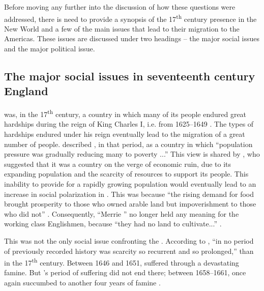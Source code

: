 Before moving any further into the discussion of how these questions were addressed, there is need to provide a synopsis of the 17\textsuperscript{th} century  presence in the New World and a few of the main issues that lead to their migration to the Americas. These issues are discussed under two headings -- the major social issues and the major political issue.

\subsection{The major social issues in seventeenth century England}\label{6.1.1}
 was, in the 17\textsuperscript{th} century, a country in which many of its people endured great hardships during the reign of King Charles I, i.e. from 1625--1649 \citep[25]{Parker11}. The types of hardships endured under his reign eventually lead to the migration of a great number of people. \citet[145]{Fisher90} described , in that period, as a country in which ``population pressure was gradually reducing many to poverty ...'' This view is shared by \citet[37]{Beckles89}, who suggested that it was a country on the verge of economic ruin, due to its expanding population and the scarcity of resources to support its people. This inability to provide for a rapidly growing population would eventually lead to an increase in social polarization in . This was because ``the rising demand for food brought prosperity to those who owned arable land but impoverishment to those who did not'' \citep[3]{Amussen09}. Consequently, ``Merrie '' no longer held any meaning for the working class Englishmen, because ``they had no land to cultivate...'' \citep[394]{Bridenbaugh68}.

This was not the only social issue confronting the . According to \citet[57]{Rogers89}, ``in no period of previously recorded history was scarcity so recurrent and so prolonged,'' than in the 17\textsuperscript{th} century. Between 1646 and 1651,  suffered through a devastating famine. But 's period of suffering did not end there; between 1658--1661,  once again succumbed to another four years of famine \citep[57]{Rogers89}.

